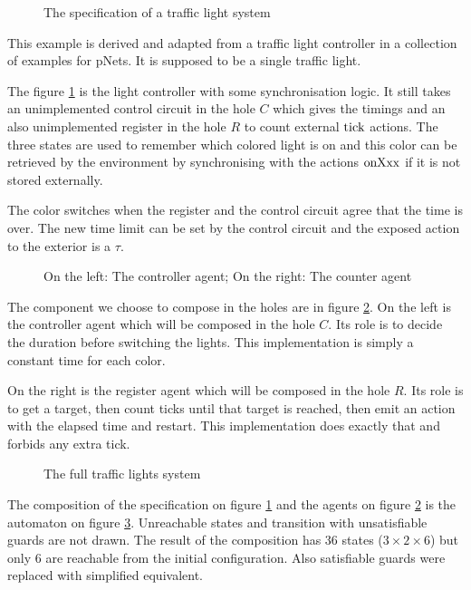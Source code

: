 \documentclass{article}
\begin{document}
\begin{exi}
\begin{figure}
\centering

\caption{The specification of a traffic light system}
\label{fig:tls}
\end{figure}
This example is derived and adapted from a traffic light controller in a collection of examples for pNets.
It is supposed to be a single traffic light.

The figure \ref{fig:tls} is the light controller with some synchronisation logic.
It still takes an unimplemented control circuit in the hole \(C\) which gives the timings and an also unimplemented register in the hole \(R\) to count external \(\mathrm{tick}\) actions.
The three states are used to remember which colored light is on and this color can be retrieved by the environment by synchronising with the actions \(\mathrm{onXxx}\) if it is not stored externally.

The color switches when the register and the control circuit agree that the time is over.
The new time limit can be set by the control circuit and the exposed action to the exterior is a \(\tau\).

\begin{figure}
\centering

\vrule

\caption{On the left: The controller agent; On the right: The counter agent}
\label{fig:tlh}
\end{figure}
The component we choose to compose in the holes are in figure \ref{fig:tlh}.
On the left is the controller agent which will be composed in the hole \(C\).
Its role is to decide the duration before switching the lights.
This implementation is simply a constant time for each color.

On the right is the register agent which will be composed in the hole \(R\).
Its role is to get a target, then count ticks until that target is reached, then emit an action with the elapsed time and restart.
This implementation does exactly that and forbids any extra tick.

\begin{figure}
\centering

\caption{The full traffic lights system}
\label{fig:tlf}
\end{figure}
The composition of the specification on figure \ref{fig:tls} and the agents on figure \ref{fig:tlh} is the automaton on figure \ref{fig:tlf}.
Unreachable states and transition with unsatisfiable guards are not drawn.
The result of the composition has 36 states (\(3 \times 2 \times 6\)) but only 6 are reachable from the initial configuration.
Also satisfiable guards were replaced with simplified equivalent.


\end{exi}
\end{document}
